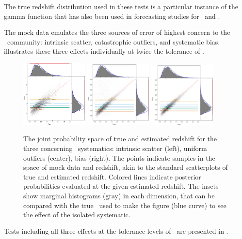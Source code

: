 The true redshift distribution used in these tests is a particular instance of the gamma function that has also been used in forecasting studies for \des\ and \lsst.

The mock data emulates the three sources of error of highest concern to the \pz\ community: intrinsic scatter, catastrophic outliers, and systematic bias.
 illustrates these three effects individually at twice the tolerance of \lsst.
\begin{figure}
	\begin{center}
		\includegraphics[width=0.3\textwidth]{figures/chippr/scatter_scatplot.png}
		\includegraphics[width=0.3\textwidth]{figures/chippr/outlier_scatplot.png}
		\includegraphics[width=0.3\textwidth]{figures/chippr/bias_scatplot.png}
		\caption{The joint probability space of true and estimated redshift for the three concerning \pz\ systematics: intrinsic scatter (left), uniform outliers (center), bias (right).
			The points indicate samples in the space of mock data and redshift, akin to the standard scatterplots of true and estimated redshift.
			Colored lines indicate posterior probabilities evaluated at the given estimated redshift.
			The insets show marginal histograms (gray) in each dimension, that can be compared with the true \nz\ used to make the figure (blue curve) to see the effect of the isolated systematic.
		}
	\end{center}
\end{figure}
Tests including all three effects at the tolerance levels of \lsst\ are presented in .

